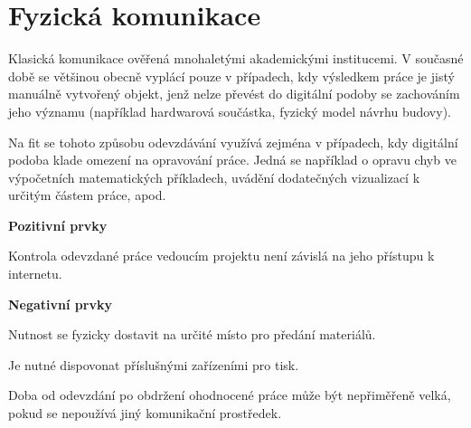 

\section{Fyzická komunikace}

Klasická komunikace ověřená mnohaletými akademickými institucemi. V současné době se většinou obecně vyplácí pouze v případech, kdy výsledkem práce je jistý manuálně vytvořený objekt, jenž nelze převést do digitální podoby se zachováním jeho významu (například hardwarová součástka, fyzický model návrhu budovy).

Na \gls{fit} se tohoto způsobu odevzdávání využívá zejména v případech, kdy digitální podoba klade omezení na opravování práce. Jedná se například o opravu chyb ve výpočetních matematických příkladech, uvádění dodatečných vizualizací k určitým částem práce, apod.

\textbf{Pozitivní prvky}
\begin{ul}
   \item Kontrola odevzdané práce vedoucím projektu není závislá na jeho přístupu k internetu.
\end{ul}

\textbf{Negativní prvky}
\begin{ul}
   \item Nutnost se fyzicky dostavit na určité místo pro předání materiálů.
   \item Je nutné dispovonat příslušnými zařízeními pro tisk.
   \item Doba od odevzdání po obdržení ohodnocené práce může být nepřiměřeně velká, pokud se nepoužívá jiný komunikační prostředek.
\end{ul}
